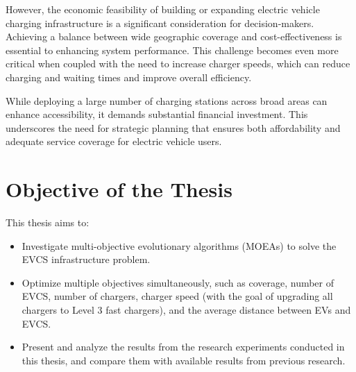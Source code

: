 However, the economic feasibility of building or expanding electric vehicle charging infrastructure is a significant consideration for decision-makers. Achieving a balance between wide geographic coverage and cost-effectiveness is essential to enhancing system performance. This challenge becomes even more critical when coupled with the need to increase charger speeds, which can reduce charging and waiting times and improve overall efficiency.

While deploying a large number of charging stations across broad areas can enhance accessibility, it demands substantial financial investment. This underscores the need for strategic planning that ensures both affordability and adequate service coverage for electric vehicle users.

\section{Objective of the Thesis}
This thesis aims to:
\begin{itemize}
    \item Investigate multi-objective evolutionary algorithms (MOEAs) to solve the EVCS infrastructure problem.
    \item Optimize multiple objectives simultaneously, such as coverage, number of EVCS, number of chargers, charger speed (with the goal of upgrading all chargers to Level 3 fast chargers), and the average distance between EVs and EVCS.
    \item Present and analyze the results from the research experiments conducted in this thesis, and compare them with available results from previous research.
\end{itemize}